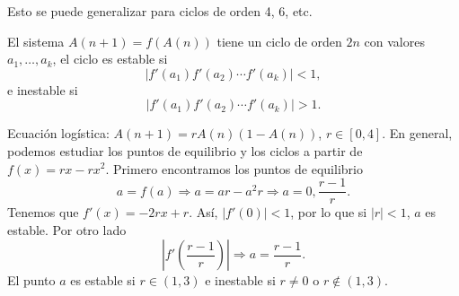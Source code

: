\begin{observation}
\normalfont Esto se puede generalizar para ciclos de orden 4, 6, etc.
\end{observation}
\begin{fdefinition}[]
\normalfont El sistema $\displaystyle A\left(n+1\right) = f\left(A\left(n\right)\right) $ tiene un ciclo de orden $\displaystyle 2n $ con valores $\displaystyle a_{1}, \ldots, a_{k} $, el ciclo es estable si 
\[ \left|f'\left(a_{1}\right)f'\left(a_{2}\right) \cdots f'\left(a_{k}\right)\right|<1 ,\]
e inestable si 
\[ \left|f'\left(a_{1}\right) f'\left(a_{2}\right) \cdots f'\left(a_{k}\right)\right|>1 .\]
\end{fdefinition}
\begin{eg}
	\normalfont Ecuación logística: $\displaystyle A\left(n+1\right) = rA\left(n\right)\left(1-A\left(n\right)\right) $, $\displaystyle r \in \left[0,4\right]  $. En general, podemos estudiar los puntos de equilibrio y los ciclos a partir de $\displaystyle f\left(x\right) = rx - rx^{2} $. Primero encontramos los puntos de equilibrio
	\[ a = f\left(a\right) \Rightarrow a = ar - a^{2}r \Rightarrow a = 0, \frac{r-1}{r}.\]
Tenemos que $\displaystyle f'\left(x\right) = -2rx + r$. Así, $\displaystyle \left|f'\left(0\right)\right|<1 $, por lo que si $\displaystyle \left|r\right| < 1 $, $\displaystyle a  $ es estable. Por otro lado
\[ \left|f'\left(\frac{r-1}{r}\right)\right| \Rightarrow a = \frac{r-1}{r} .\]
El punto $\displaystyle a $ es estable si $\displaystyle r \in \left(1,3\right) $ e inestable si $\displaystyle r \neq 0 $ o $\displaystyle r \not\in\left(1,3\right) $. 
\end{eg}

